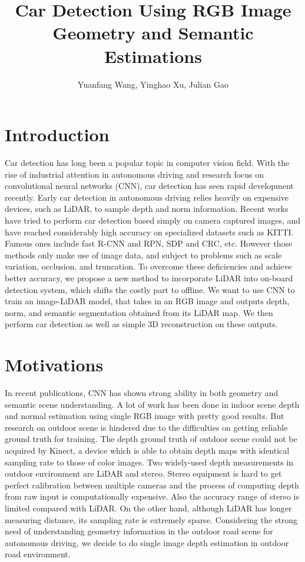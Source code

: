 \documentclass[a4paper]{article}
\title{Car Detection Using RGB Image Geometry and Semantic Estimations}
\author{Yuanfang Wang, Yinghao Xu, Julian Gao}
\begin{document}
\maketitle


\section{Introduction}
Car detection has long been a popular topic in computer vision field. With the rise of industrial attention in autonomous driving and research focus on convolutional neural networks (CNN), car detection has seen rapid development recently. Early car detection in autonomous driving relies heavily on expensive devices, such as LiDAR, to sample depth and norm information. Recent works have tried to perform car detection based simply on camera captured images, and have reached considerably high accuracy on specialized datasets such as KITTI. Famous ones include fast R-CNN and RPN\cite{renFasterRCNN}, SDP and CRC\cite{sdpcrc}, etc. However those methods only make use of image data, and subject to problems such as scale variation, occlusion, and truncation\cite{subcatCNN}. To overcome these deficiencies and achieve better accuracy, we propose a new method to incorporate LiDAR into on-board detection system, which shifts the costly part to offline. We want to use CNN to train an image-LiDAR model, that takes in an RGB image and outputs depth, norm, and semantic segmentation obtained from its LiDAR map. We then perform car detection as well as simple 3D reconstruction on these outputs.

\section{Motivations}
In recent publications, CNN has shown strong ability in both geometry and semantic scene understanding. A lot of work has been done in indoor scene depth and normal estimation using single RGB image with pretty good results\cite{laina2016deeper}\cite{li2015depth}\cite{hane2015direction}\cite{eigen2015predicting}. But research on outdoor scene is hindered due to the difficulties on getting reliable ground truth for training. The depth ground truth of outdoor scene could not be acquired by Kinect, a device which is able to obtain depth maps with identical sampling rate to those of color images. Two widely-used depth measurements in outdoor environment are LiDAR and stereo. Stereo equipment is hard to get perfect calibration between multiple cameras and the process of computing depth from raw input is computationally expensive. Also the accuracy range of stereo is limited compared with LiDAR. On the other hand, although LiDAR has longer measuring distance, its sampling rate is extremely sparse. Considering the strong need of understanding geometry information in the outdoor road scene for autonomous driving, we decide to do single image depth estimation in outdoor road environment. 
\end{document}
